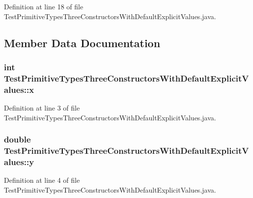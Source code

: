 Definition at line 18 of file TestPrimitiveTypesThreeConstructorsWithDefaultExplicitValues.java.



\subsection{Member Data Documentation}
\hypertarget{classTestPrimitiveTypesThreeConstructorsWithDefaultExplicitValues_a546ef6f93619697ea31aaa5d4039c52e}{
\subsubsection[{x}]{\setlength{\rightskip}{0pt plus 5cm}int {\bf TestPrimitiveTypesThreeConstructorsWithDefaultExplicitValues::x}}}
\label{classTestPrimitiveTypesThreeConstructorsWithDefaultExplicitValues_a546ef6f93619697ea31aaa5d4039c52e}


Definition at line 3 of file TestPrimitiveTypesThreeConstructorsWithDefaultExplicitValues.java.

\hypertarget{classTestPrimitiveTypesThreeConstructorsWithDefaultExplicitValues_ad18f6bf3076e7c42bb6b3d32e5639723}{
\subsubsection[{y}]{\setlength{\rightskip}{0pt plus 5cm}double {\bf TestPrimitiveTypesThreeConstructorsWithDefaultExplicitValues::y}}}
\label{classTestPrimitiveTypesThreeConstructorsWithDefaultExplicitValues_ad18f6bf3076e7c42bb6b3d32e5639723}


Definition at line 4 of file TestPrimitiveTypesThreeConstructorsWithDefaultExplicitValues.java.



